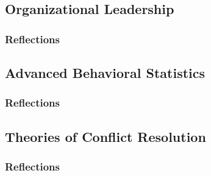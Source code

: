 \documentclass[12pt,titlepage]{article}
\begin{document}
\subsection{Organizational Leadership}
\subsubsection{Reflections}


\restoregeometry



\restoregeometry


\subsection{Advanced Behavioral Statistics}
\subsubsection{Reflections}

\subsection{Theories of Conflict Resolution}
\subsubsection{Reflections}



\end{document}
